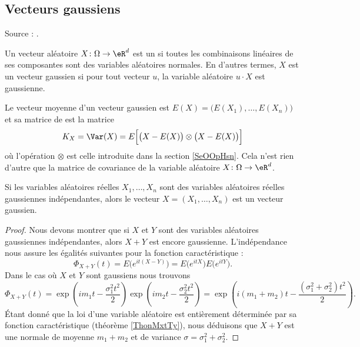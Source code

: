 \subsection{Vecteurs gaussiens}

Source : \cite{ProbaDanielLi,GaussienYoann}.

\begin{definition}
    Un vecteur aléatoire \( X\colon \Omega\to \eR^d\) est un  si toutes les combinaisons linéaires de ses composantes sont des variables aléatoires normales. En d'autres termes, \( X\) est un vecteur gaussien si pour tout vecteur \( u\), la variable aléatoire \( u\cdot X\) est gaussienne.
\end{definition}

Le vecteur moyenne d'un vecteur gaussien est \( E(X)=\big( E(X_1),\ldots, E(X_n) \big)\) et sa matrice de  est la matrice
\begin{equation}
    K_X=\Var(X)=E\Big[ \big( X-E(X) \big)\otimes \big( X-E(X) \big) \Big]
\end{equation}
où l'opération \( \otimes\) est celle introduite dans la section \ref{SeOOpHsn}. Cela n'est rien d'autre que la matrice de covariance de la variable aléatoire \( X\colon \Omega\to \eR^d\).

\begin{lemma}
    Si les variables aléatoires réelles \( X_1,\ldots, X_n\) sont des variables aléatoires réelles gaussiennes indépendantes, alors le vecteur \( X=(X_1,\ldots, X_n)\) est un vecteur gaussien.
\end{lemma}

\begin{proof}
    Nous devons montrer que si \( X\) et \( Y\) sont des variables aléatoires gaussiennes indépendantes, alors \( X+Y\) est encore gaussienne. L'indépendance nous assure les égalités suivantes pour la fonction caractéristique :
    \begin{equation}
        \Phi_{X+Y}(t)=E\big(  e^{it(X-Y)} \big)=E\big(  e^{itX} \big)E\big(  e^{itY} \big).
    \end{equation}
    Dans le cas où \( X\) et \( Y\) sont gaussiens nous trouvons
    \begin{equation}
        \Phi_{X+Y}(t)=\exp\left( im_1t-\frac{ \sigma_1^2t^2 }{2} \right)\exp\left( im_2t-\frac{ \sigma_2^2t^2 }{2} \right)=\exp\left( i(m_1+m_2)t-\frac{ (\sigma_1^2+\sigma_2^2)t^2 }{2} \right).
    \end{equation}
    Étant donné que la loi d'une variable aléatoire est entièrement déterminée par sa fonction caractéristique (théorème \ref{ThonMxtTy}), nous déduisons que \( X+Y\) est une normale de moyenne \( m_1+m_2\) et de variance \( \sigma=\sigma_1^2+\sigma_2^2\).
\end{proof}

